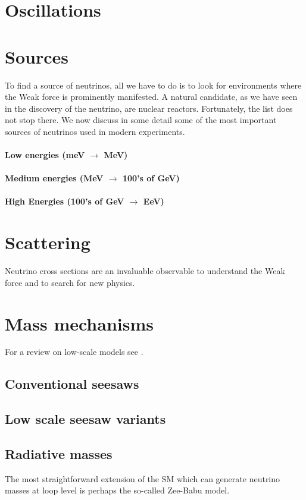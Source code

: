 
\section{Oscillations}

\section{Sources}

To find a source of neutrinos, all we have to do is to look for environments where the Weak force is prominently manifested. A natural candidate, as we have seen in the discovery of the neutrino, are nuclear reactors. Fortunately, the list does not stop there. We now discuss in some detail some of the most important sources of neutrinos used in modern experiments.

\paragraph{Low energies (meV $\to$ MeV)}

\paragraph{Medium energies (MeV $\to$ 100's of GeV)}

\paragraph{High Energies (100's of GeV $\to$ EeV)}


\section{Scattering}

Neutrino cross sections are an invaluable observable to understand the Weak force and to search for new physics. 

\begin{figure}
\end{figure}



\section{Mass mechanisms}

For a review on low-scale models see \cite{Boucenna:2014zba}.

\subsection{Conventional seesaws}

\subsection{Low scale seesaw variants}

\subsection{Radiative masses}

The most straightforward extension of the SM which can generate neutrino masses at loop level is perhaps the so-called Zee-Babu model.
